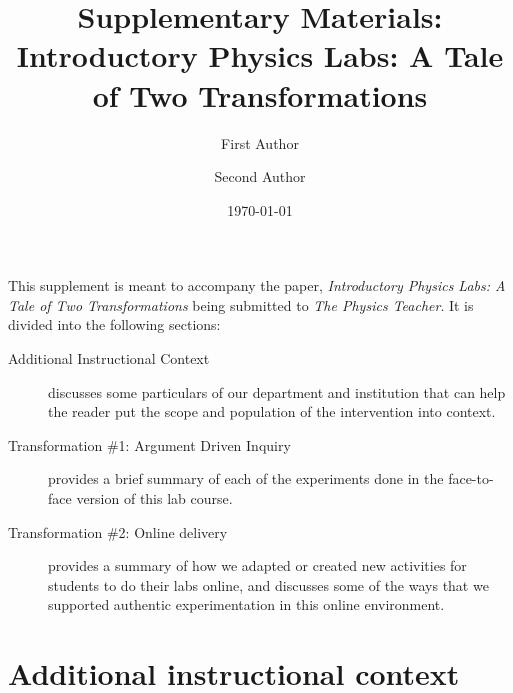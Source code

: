 \documentclass[aip, numerical, preprint]{revtex4-2}
\begin{document}
\title{Supplementary Materials: Introductory Physics Labs: A Tale of Two Transformations}


\author{First Author} 

\author{Second Author} 

\date{\today}


\maketitle

This supplement is meant to accompany the paper, \textit{Introductory Physics Labs: A Tale of
  Two Transformations} being submitted to \textit{The Physics Teacher}.  It is divided into the
following sections:
\begin{description}
  \item[Additional Instructional Context] discusses some particulars of our department and
  institution that can help the reader put the scope and population of the intervention into
  context.
  \item[Transformation \#1: Argument Driven Inquiry] provides a brief summary of each of the
  experiments done in the face-to-face version of this lab course.
  \item[Transformation \#2: Online delivery] provides a summary of how we adapted or created
  new activities for students to do their labs online, and discusses some of the ways that we
  supported authentic experimentation in this online environment.
\end{description}

\section{Additional instructional context}
\end{document}
